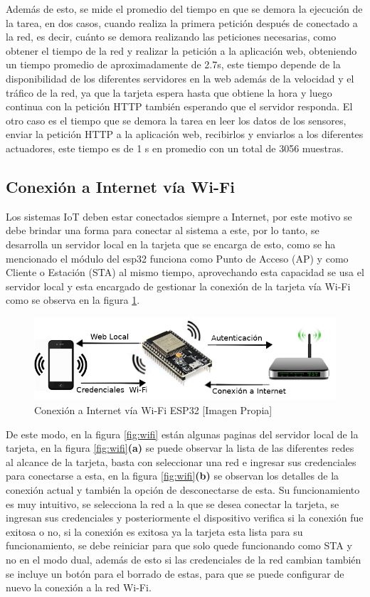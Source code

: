 Además de esto, se mide el promedio del tiempo en que se demora la ejecución de la tarea, en dos casos, cuando realiza la primera petición después de conectado a la red, es decir, cuánto se demora realizando las peticiones necesarias, como obtener el tiempo de la red y realizar la petición a la aplicación web, obteniendo un tiempo promedio de aproximadamente de 2.7s, este tiempo depende de la disponibilidad de los diferentes servidores en la web además de la velocidad y el tráfico de la red, ya que la tarjeta espera hasta que obtiene la hora y luego continua con la petición HTTP también esperando que el servidor responda. El otro caso es el tiempo que se demora la tarea en leer los datos de los sensores, enviar la petición HTTP a la aplicación web, recibirlos y enviarlos a los diferentes actuadores, este tiempo es de 1 s en promedio con un total de 3056 muestras.

\subsection{Conexión a Internet vía Wi-Fi}\label{sub:wifi}

Los sistemas IoT deben estar conectados siempre a Internet, por este motivo se debe brindar una forma para conectar al sistema a este, por lo tanto, se desarrolla un servidor local en la tarjeta que se encarga de esto, como se ha mencionado el módulo del esp32 funciona como Punto de Acceso (AP) y como Cliente o Estación (STA) al mismo tiempo, aprovechando esta capacidad se usa el servidor local y esta encargado de gestionar la conexión de la tarjeta vía Wi-Fi como se observa en la figura \ref{fig:conexion}.\\

\begin{figure}[H]
	\centering
	\caption{Conexión a Internet vía Wi-Fi ESP32 [Imagen Propia]}
	\label{fig:conexion}
	\includegraphics[width=0.7\linewidth]{Imagenes/conexion}
\end{figure}


De este modo, en la figura \ref{fig:wifi} están algunas paginas del servidor local de la tarjeta, en la figura \ref{fig:wifi}\textbf{(a)} se puede observar la lista de las diferentes redes al alcance de la tarjeta, basta con seleccionar una red e ingresar sus credenciales para conectarse a esta, en la figura \ref{fig:wifi}\textbf{(b)} se observan los detalles de la conexión actual y también la opción de desconectarse de esta. Su funcionamiento es muy intuitivo, se selecciona la red a la que se desea conectar la tarjeta, se ingresan sus credenciales y posteriormente el dispositivo verifica si la conexión fue exitosa o no, si la conexión es exitosa ya la tarjeta esta lista para su funcionamiento, se debe reiniciar para que solo quede funcionando como STA y no en el modo dual, además de esto si las credenciales de la red cambian también se incluye un botón para el borrado de estas, para que se puede configurar de nuevo la conexión a la red Wi-Fi.

